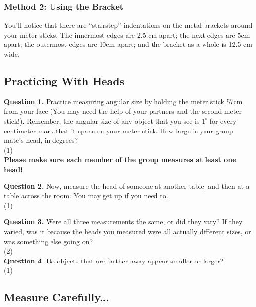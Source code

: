 \documentclass[11pt]{article}
\begin{document}
\subsubsection{Method 2: Using the Bracket}

You'll notice that there are ``stairstep'' indentations on the metal brackets around your meter sticks. The innermost edges are 2.5 cm apart; the next edges are 5cm apart; the outermost edges are 10cm apart; and the bracket as a 
whole is 12.5 cm wide. 

\subsection{Practicing With Heads}

\textbf{Question 1.} Practice measuring angular size by holding the meter stick 57cm from your face (You may need the help of your partners and the second meter stick!).
Remember, the angular size of any object that you see is $1^\circ$ for every centimeter mark that it spans on your meter stick. How large is your group mate's head, in degrees?\\

\vspace*{1.5cm}
(1) \hrulefill\\
\textbf{Please make sure each member of the group measures at least one head!}

\textbf{Question 2.} Now, measure the head of someone at another table, and then at a table across the room. You may get up if you need to.\\

\vspace{1.5cm}
(1) \hrulefill

\newpage

\textbf{Question 3.} Were all three measurements the same, or did they vary? If they varied, was it because the heads you measured were all actually different sizes, or was something else going on?\\

\vspace{1.5cm}
(2) \hrulefill\\

\textbf{Question 4.} Do objects that are farther away appear smaller or larger?\\

\vspace{1.5cm}
(1) \hrulefill\\

\subsection{Measure Carefully...}
\end{document}
